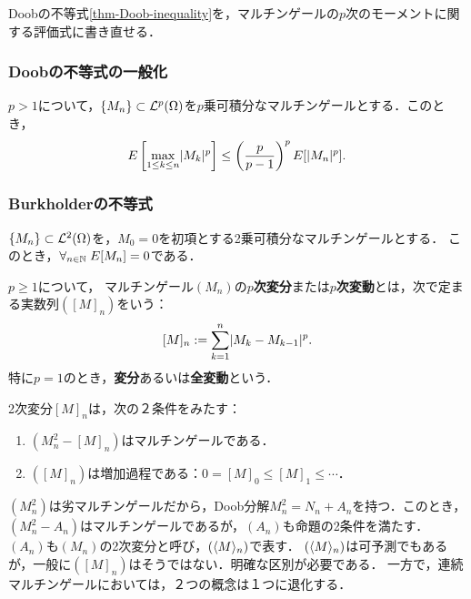 \documentclass[uplatex,dvipdfmx]{jsreport}
\begin{document}
\begin{tcolorbox}[colframe=ForestGreen, colback=ForestGreen!10!white,breakable,colbacktitle=ForestGreen!40!white,coltitle=black,fonttitle=\bfseries\sffamily,
title=]
    Doobの不等式\ref{thm-Doob-inequality}を，マルチンゲールの$p$次のモーメントに関する評価式に書き直せる．
\end{tcolorbox}

\subsubsection{Doobの不等式の一般化}

\begin{theorem}
    $p>1$について，$\{M_n\}\subset\mathcal{L}^p(\Omega)$を$p$乗可積分なマルチンゲールとする．このとき，
    \[E\left[\max_{1\le k\le n}\lvert M_k\rvert^p\right]\le\left(\frac{p}{p-1}\right)^pE[\lvert M_n\rvert^p].\]
\end{theorem}

\subsubsection{Burkholderの不等式}

\begin{notation}
    $\{M_n\}\subset\mathcal{L}^2(\Omega)$を，$M_0=0$を初項とする2乗可積分なマルチンゲールとする．
    このとき，$\forall_{n\in\mathbb{N}}\;E[M_n]=0$である．
\end{notation}

\begin{definition}
    $p\ge 1$について，
    マルチンゲール$(M_n)$の\textbf{$p$次変分}または\textbf{$p$次変動}とは，次で定まる実数列$([M]_n)$をいう：
    \[[M]_n:=\sum^n_{k=1}\lvert M_k-M_{k-1}\rvert^p.\]
    特に$p=1$のとき，\textbf{変分}あるいは\textbf{全変動}という．
\end{definition}

\begin{proposition}
    2次変分$[M]_n$は，次の２条件をみたす：
    \begin{enumerate}
        \item $(M_n^2-[M]_n)$はマルチンゲールである．
        \item $([M]_n)$は増加過程である：$0=[M]_0\le[M]_1\le\cdots$．
    \end{enumerate}
\end{proposition}

\begin{remark}
    $(M^2_n)$は劣マルチンゲールだから，Doob分解$M_n^2=N_n+A_n$を持つ．このとき，$(M_n^2-A_n)$はマルチンゲールであるが，$(A_n)$も命題の2条件を満たす．
    $(A_n)$も$(M_n)$の2次変分と呼び，$(\langle M\rangle_n)$で表す．
    $(\langle M\rangle_n)$は可予測でもあるが，一般に$([M]_n)$はそうではない．明確な区別が必要である．
    一方で，連続マルチンゲールにおいては，２つの概念は１つに退化する．
\end{remark}
\end{document}
